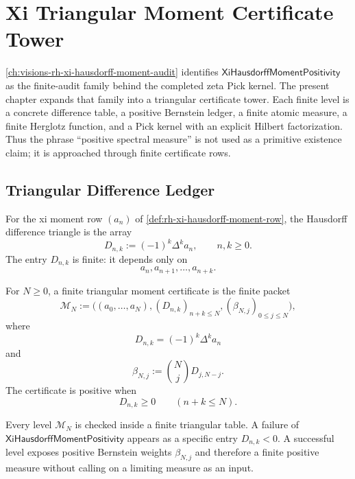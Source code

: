 \chapter{Xi Triangular Moment Certificate Tower}
\label{ch:visions-rh-xi-triangular-moment-certificate-tower}

\autoref{ch:visions-rh-xi-hausdorff-moment-audit} identifies
$\mathsf{XiHausdorffMomentPositivity}$ as the finite-audit family behind
the completed zeta Pick kernel. The present chapter expands that family
into a triangular certificate tower. Each finite level is a concrete
difference table, a positive Bernstein ledger, a finite atomic measure,
a finite Herglotz function, and a Pick kernel with an explicit Hilbert
factorization. Thus the phrase ``positive spectral measure'' is not used
as a primitive existence claim; it is approached through finite
certificate rows.

\section{Triangular Difference Ledger}
\label{sec:rh-xi-triangular-difference-ledger}

\begin{definition}
\label{def:rh-xi-hausdorff-difference-triangle}
For the xi moment row $(a_n)$ of
\autoref{def:rh-xi-hausdorff-moment-row}, the Hausdorff difference
triangle is the array
$$
D_{n,k}
:=
(-1)^k\Delta^k a_n,
\qquad
n,k\ge0.
$$
The entry $D_{n,k}$ is finite: it depends only on
$$
a_n,a_{n+1},\ldots,a_{n+k}.
$$
\end{definition}

\begin{definition}
\label{def:rh-finite-triangular-moment-certificate}
For $N\ge0$, a finite triangular moment certificate is the finite packet
$$
\mathcal M_N
:=
\bigl(
(a_0,\ldots,a_N),
(D_{n,k})_{n+k\le N},
(\beta_{N,j})_{0\le j\le N}
\bigr),
$$
where
$$
D_{n,k}=(-1)^k\Delta^k a_n
$$
and
$$
\beta_{N,j}
:=
\binom{N}{j}
D_{j,N-j}.
$$
The certificate is positive when
$$
D_{n,k}\ge0
\qquad
(n+k\le N).
$$
\end{definition}

\begin{principle}
\label{prin:rh-triangular-audit-local-finite}
Every level $\mathcal M_N$ is checked inside a finite triangular table.
A failure of $\mathsf{XiHausdorffMomentPositivity}$ appears as a
specific entry $D_{n,k}<0$. A successful level exposes positive Bernstein
weights $\beta_{N,j}$ and therefore a finite positive measure without
calling on a limiting measure as an input.
\end{principle}


